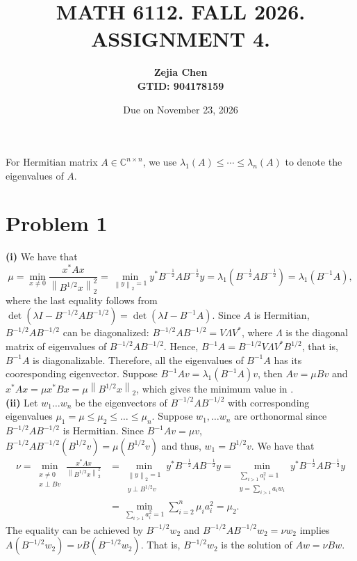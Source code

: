 \documentclass[11pt]{article}
\title{MATH 6112. FALL 2026. ASSIGNMENT 4.}
\date{Due on November 23, 2026}
\author{{\textbf{Zejia Chen}} \\ \textbf{GTID: 904178159}}
\theoremstyle{plain}
\theoremstyle{definition}
\theoremstyle{remark}
\newcommand{\norm}[1]{\left\lVert #1 \right\rVert}
\newcommand{\C}{\mathbb{C}}
\newcommand{\tuple}[1]{\left(#1\right)}
\newcommand{\tp}{\tuple}
\begin{document}
\maketitle
For Hermitian matrix $A \in \C^{n\times n}$, we use $\lambda_1(A)\leq \cdots \leq \lambda_n(A)$ to denote the eigenvalues of $A$.
\section*{Problem 1}
\textbf{(i)}
We have that 
\begin{equation}\label{eq:P1_1}
    \mu = \min_{x\neq 0} \frac{x^*Ax}{\norm{B^{1/2}x}_2^2} = \min_{\norm{y}_2=1} y^*B^{-\frac 12}AB^{-\frac 12}y = \lambda_1\tp{B^{-\frac 12}AB^{-\frac 12}} = \lambda_1(B^{-1}A),
\end{equation}
where the last equality follows from $\det\tp{\lambda I - B^{-1/2}AB^{-1/2}} = \det\tp{\lambda I - B^{-1}A}$.
Since $A$ is Hermitian, $B^{-1/2}AB^{-1/2}$ can be diagonalized: $B^{-1/2}AB^{-1/2} = V\Lambda V^*$, where $\Lambda$ is the diagonal matrix of eigenvalues of $B^{-1/2}AB^{-1/2}$.
Hence, $B^{-1}A = B^{-1/2}V\Lambda V^*B^{1/2}$, that is, $B^{-1}A$ is diagonalizable.
Therefore, all the eigenvalues of $B^{-1}A$ has its cooresponding eigenvector.
Suppose $B^{-1}A v = \lambda_1(B^{-1}A)v$, then $Av = \mu Bv$ and $x^*Ax = \mu x^*Bx = \mu \norm{B^{1/2}x}_2$, which gives the minimum value in .
\\\textbf{(ii)}
Let $w_1\ldots w_n$ be the eigenvectors of $B^{-1/2}AB^{-1/2}$ with corresponding eigenvalues $\mu_1=\mu\leq\mu_2\leq\ldots \leq\mu_n$.
Suppose $w_1,\ldots w_n$ are orthonormal since $B^{-1/2}AB^{-1/2}$ is Hermitian.
Since $B^{-1}Av = \mu v$, $B^{-1/2}AB^{-1/2}(B^{1/2}v) = \mu(B^{1/2}v)$ and thus, $w_1 = B^{1/2}v$.
We have that 
\begin{align}\label{eq:P1_2}
    \nu = \min_{\substack{x\neq 0\\x\perp Bv}} \frac{x^*Ax}{\norm{B^{1/2}x}_2^2} &= \min_{\substack{\norm{y}_2=1\\y\perp B^{1/2}v}}y^*B^{-\frac 12}AB^{-\frac 12}y  = \min_{\substack{\sum_{i>1} a_i^2 = 1\\y=\sum_{i>1}a_iw_i}} y^*B^{-\frac 12}AB^{-\frac 12}y
    \\&= \min_{\sum_{i>1} a_i^2 = 1}\sum_{i=2}^n \mu_i a_i^2 = \mu_2.
\end{align}
The equality can be achieved by $B^{-1/2}w_2$ and $B^{-1/2}AB^{-1/2}w_2 = \nu w_2$ implies $A(B^{-1/2}w_2) = \nu B(B^{-1/2}w_2)$.
That is, $B^{-1/2}w_2$ is the solution of $Aw = \nu Bw$.
\end{document}
